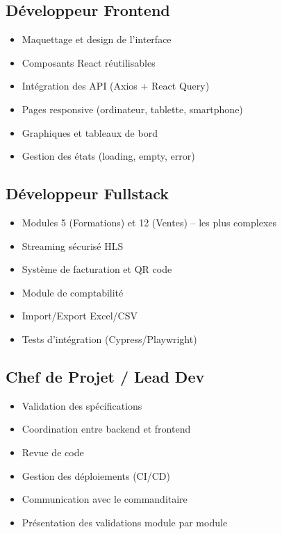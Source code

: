 \documentclass[12pt,a4paper]{report}
\begin{document}
\subsection*{Développeur Frontend}
\begin{itemize}
    \item Maquettage et design de l'interface
    \item Composants React réutilisables
    \item Intégration des API (Axios + React Query)
    \item Pages responsive (ordinateur, tablette, smartphone)
    \item Graphiques et tableaux de bord
    \item Gestion des états (loading, empty, error)
\end{itemize}

\subsection*{Développeur Fullstack}
\begin{itemize}
    \item Modules 5 (Formations) et 12 (Ventes) -- les plus complexes
    \item Streaming sécurisé HLS
    \item Système de facturation et QR code
    \item Module de comptabilité
    \item Import/Export Excel/CSV
    \item Tests d'intégration (Cypress/Playwright)
\end{itemize}

\subsection*{Chef de Projet / Lead Dev}
\begin{itemize}
    \item Validation des spécifications
    \item Coordination entre backend et frontend
    \item Revue de code
    \item Gestion des déploiements (CI/CD)
    \item Communication avec le commanditaire
    \item Présentation des validations module par module
\end{itemize}

\end{document}
